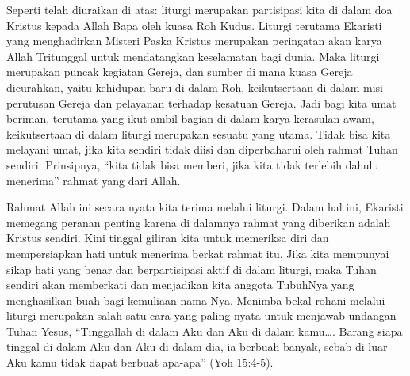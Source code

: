 Seperti telah diuraikan di atas: liturgi merupakan partisipasi kita di dalam doa Kristus kepada Allah Bapa oleh kuasa Roh Kudus. Liturgi terutama Ekaristi yang menghadirkan Misteri Paska Kristus merupakan peringatan akan karya Allah Tritunggal untuk mendatangkan keselamatan bagi dunia. Maka liturgi merupakan puncak kegiatan Gereja, dan sumber di mana kuasa Gereja dicurahkan, yaitu kehidupan baru di dalam Roh, keikutsertaan di dalam misi perutusan Gereja dan pelayanan terhadap kesatuan Gereja. Jadi bagi kita umat beriman, terutama yang ikut ambil bagian di dalam karya kerasulan awam, keikutsertaan di dalam liturgi merupakan sesuatu yang utama. Tidak bisa kita melayani umat, jika kita sendiri tidak diisi dan diperbaharui oleh rahmat Tuhan sendiri. Prinsipnya, “kita tidak bisa memberi, jika kita tidak terlebih dahulu menerima” rahmat yang dari Allah.

Rahmat Allah ini secara nyata kita terima melalui liturgi. Dalam hal ini, Ekaristi memegang peranan penting karena di dalamnya rahmat yang diberikan adalah Kristus sendiri. Kini tinggal giliran kita untuk memeriksa diri dan mempersiapkan hati untuk menerima berkat rahmat itu. Jika kita mempunyai sikap hati yang benar dan berpartisipasi aktif di dalam liturgi, maka Tuhan sendiri akan memberkati dan menjadikan kita anggota TubuhNya yang menghasilkan buah bagi kemuliaan nama-Nya. Menimba bekal rohani melalui liturgi merupakan salah satu cara yang paling nyata untuk menjawab undangan Tuhan Yesus, “Tinggallah di dalam Aku dan Aku di dalam kamu…. Barang siapa tinggal di dalam Aku dan Aku di dalam dia, ia berbuah banyak, sebab di luar Aku kamu tidak dapat berbuat apa-apa” (Yoh 15:4-5).
